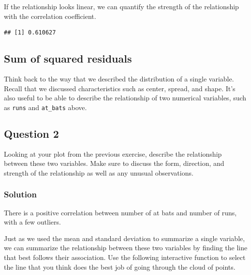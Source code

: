 \documentclass[]{article}
\newenvironment{Shaded}{\begin{snugshade}}{\end{snugshade}}
\newcommand{\KeywordTok}[1]{\textcolor[rgb]{0.13,0.29,0.53}{\textbf{#1}}}
\newcommand{\DataTypeTok}[1]{\textcolor[rgb]{0.13,0.29,0.53}{#1}}
\newcommand{\OperatorTok}[1]{\textcolor[rgb]{0.81,0.36,0.00}{\textbf{#1}}}
\newcommand{\NormalTok}[1]{#1}
\begin{document}
If the relationship looks linear, we can quantify the strength of the
relationship with the correlation coefficient.

\begin{Shaded}
\end{Shaded}

\begin{verbatim}
## [1] 0.610627
\end{verbatim}

\subsection{Sum of squared residuals}\label{sum-of-squared-residuals}

Think back to the way that we described the distribution of a single
variable. Recall that we discussed characteristics such as center,
spread, and shape. It's also useful to be able to describe the
relationship of two numerical variables, such as \texttt{runs} and
\texttt{at\_bats} above.

\subsection{Question 2}\label{question-2}

Looking at your plot from the previous exercise, describe the
relationship between these two variables. Make sure to discuss the form,
direction, and strength of the relationship as well as any unusual
observations.

\subsubsection{Solution}\label{solution-1}

There is a positive correlation between number of at bats and number of
runs, with a few outliers.

Just as we used the mean and standard deviation to summarize a single
variable, we can summarize the relationship between these two variables
by finding the line that best follows their association. Use the
following interactive function to select the line that you think does
the best job of going through the cloud of points.

\begin{Shaded}
\end{Shaded}
\end{document}

